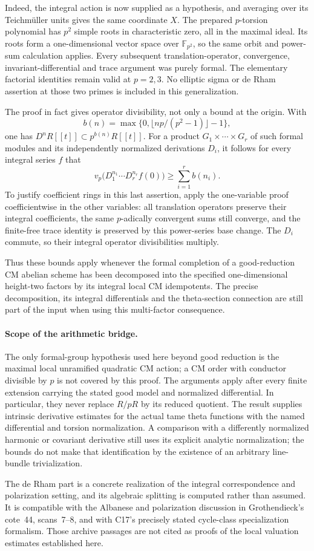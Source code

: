 Indeed, the integral action is now supplied as a hypothesis,
and averaging over its Teichm\"uller units gives the same
coordinate $X$.  The prepared $p$-torsion polynomial has
$p^2$ simple roots in characteristic zero, all in the maximal
ideal.  Its roots form a one-dimensional vector space over
$\mathbb F_{p^2}$, so the same orbit and power-sum calculation
applies.  Every subsequent translation-operator, convergence,
invariant-differential and trace argument was purely formal.
The elementary factorial identities remain valid at $p=2,3$.
No elliptic sigma or de Rham assertion at those two primes
is included in this generalization.

The proof in fact gives operator divisibility, not only a
bound at the origin.  With
\[
 b(n)=\max\{0,\lfloor np/(p^2-1)\rfloor-1\},
\]
one has $D^nR[[t]]\subset p^{b(n)}R[[t]]$.
For a product $G_1\times\cdots\times G_r$ of such formal
modules and its independently normalized derivations $D_i$,
it follows for every integral series $f$ that
\[
 v_p\bigl(D_1^{n_1}\cdots D_r^{n_r}f(0)\bigr)
       \geq\sum_{i=1}^r b(n_i).
\]
To justify coefficient rings in this last assertion, apply the
one-variable proof coefficientwise in the other variables:
all translation operators preserve their integral coefficients,
the same $p$-adically convergent sums still converge, and the
finite-free trace identity is preserved by this power-series
base change.  The $D_i$ commute, so their integral operator
divisibilities multiply.

Thus these bounds apply whenever the formal completion of a
good-reduction CM abelian scheme has been decomposed into the
specified one-dimensional height-two factors by its integral
local CM idempotents.  The precise decomposition, its integral
differentials and the theta-section connection are still part
of the input when using this multi-factor consequence.

\paragraph{Scope of the arithmetic bridge.}
The only formal-group hypothesis used here beyond good reduction
is the maximal local unramified quadratic CM action; a CM order
with conductor divisible by $p$ is not covered by this proof.
The arguments apply after every finite extension carrying the
stated good model and normalized differential.  In particular,
they never replace $R/pR$ by its reduced quotient.
The result supplies intrinsic derivative estimates for the actual
tame theta functions with the named differential and torsion
normalization.  A comparison with a differently normalized
harmonic or covariant derivative still uses its explicit analytic
normalization; the bounds do not make that identification by
the existence of an arbitrary line-bundle trivialization.

The de Rham part is a concrete realization of the integral
correspondence and polarization setting, and its algebraic
splitting is computed rather than assumed.  It is compatible
with the Albanese and polarization discussion in Grothendieck's
cote~44, scans~7--8, and with C17's precisely stated cycle-class
specialization formalism.  Those archive passages are not cited
as proofs of the local valuation estimates established here.

